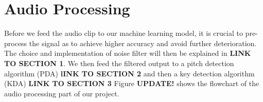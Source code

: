 \chapter{Audio Processing} %

\label{Chapter5} %
Before we feed the audio clip to our machine learning model, it is crucial to pre-process the signal as to achieve higher accuracy
and avoid further deterioration.
The choice and implementation of noise filter will then be explained in \textbf{LINK TO SECTION 1}. We then feed the filtered output 
to a pitch detection algorithm (PDA) \textbf{lINK TO SECTION 2} and then a key detection algorithm (KDA) \textbf{LINK TO SECTION 3}
Figure \textbf{UPDATE!} shows the flowchart of the audio processing part of our project.



